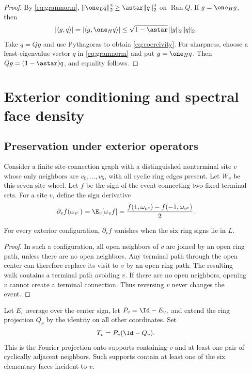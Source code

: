 \begin{proof}
By \eqref{eq:gramnorm}, $\|\one_Lq\|_2^2\ge\astar\|q\|_2^2$ on $\operatorname{Ran}Q$. If $g=\one_Hg$, then
\[
 |\langle g,q\rangle|=|\langle g,\one_Hq\rangle|
 \le\sqrt{1-\astar}\,\|g\|_2\|q\|_2.
\]
Take $q=Qg$ and use Pythagoras to obtain \eqref{eq:coercivity}. For sharpness, choose a least-eigenvalue vector $q$ in \eqref{eq:gramnorm} and put $g=\one_Hq$. Then $Qg=(1-\astar)q$, and equality follows.
\end{proof}

\section{Exterior conditioning and spectral face density}\label{sec:faces}
\subsection{Preservation under exterior operators}\label{sec:conditioning}

Consider a finite site-connection graph with a distinguished nonterminal site $v$ whose only neighbors are $v_0,\ldots,v_5$, with all cyclic ring edges present. Let $W_v$ be this seven-site wheel. Let $f$ be the sign of the event connecting two fixed terminal sets. For a site $v$, define the sign derivative
\[
 \partial_v f(\omega_{v^c})
 =\E_v[\omega_vf]
 =\frac{f(1,\omega_{v^c})-f(-1,\omega_{v^c})}{2}.
\]

\begin{lemma}\label{lem:zero}
For every exterior configuration, $\partial_vf$ vanishes when the six ring signs lie in $L$.
\end{lemma}
\begin{proof}
In such a configuration, all open neighbors of $v$ are joined by an open ring path, unless there are no open neighbors. Any terminal path through the open center can therefore replace its visit to $v$ by an open ring path. The resulting walk contains a terminal path avoiding $v$. If there are no open neighbors, opening $v$ cannot create a terminal connection. Thus reversing $v$ never changes the event.
\end{proof}

Let $E_v$ average over the center sign, let $P_v=\Id-E_v$, and extend the ring projection $Q_v$ by the identity on all other coordinates. Set
\[
 T_v=P_v(\Id-Q_v).
\]
This is the Fourier projection onto supports containing $v$ and at least one pair of cyclically adjacent neighbors. Such supports contain at least one of the six elementary faces incident to $v$.

